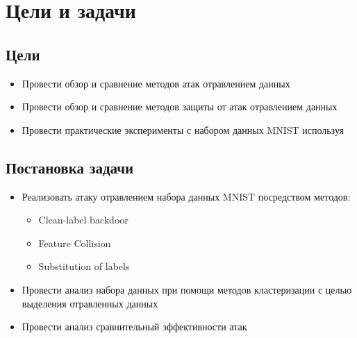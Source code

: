 \section*{Цели и задачи}

\subsection*{Цели}
\begin{itemize}
    \item Провести обзор и сравнение методов атак отравлением данных
    \item Провести обзор и сравнение методов защиты от атак отравлением данных
    \item Провести практические эксперименты с набором данных MNIST используя
\end{itemize}

\subsection*{Постановка задачи}
\begin{itemize}
    \item Реализовать атаку отравлением набора данных MNIST посредством методов:
    \begin{itemize}
        \item Clean-label backdoor
        \item Feature Collision
        \item Substitution of labels
    \end{itemize}
    \item Провести анализ набора данных при помощи методов кластеризации с целью выделения отравленных данных
    \item Провести анализ сравнительный эффективности атак
\end{itemize}
